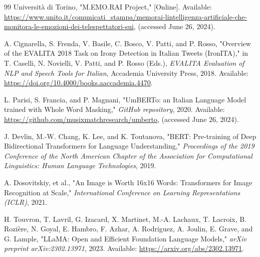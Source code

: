 \documentclass[letterpaper,journal]{IEEEtran}
\begin{document}
\begin{thebibliography}{99}
 Università di Torino, "M.EMO.RAI Project," [Online]. Available: \url{https://www.unito.it/comunicati_stampa/memorai-lintelligenza-artificiale-che-monitora-le-emozioni-dei-telespettatori-sui}, (accessed June 26, 2024).

 A. Cignarella, S. Frenda, V. Basile, C. Bosco, V. Patti, and P. Rosso, "Overview of the EVALITA 2018 Task on Irony Detection in Italian Tweets (IronITA)," in T. Caselli, N. Novielli, V. Patti, and P. Rosso (Eds.), \textit{EVALITA Evaluation of NLP and Speech Tools for Italian}, Accademia University Press, 2018. Available: \url{https://doi.org/10.4000/books.aaccademia.4470}.

 L. Parisi, S. Francia, and P. Magnani, "UmBERTo: an Italian Language Model trained with Whole Word Masking," \textit{GitHub repository}, 2020. Available: \url{https://github.com/musixmatchresearch/umberto}, (accessed June 26, 2024).

 J. Devlin, M.-W. Chang, K. Lee, and K. Toutanova, "BERT: Pre-training of Deep Bidirectional Transformers for Language Understanding," \textit{Proceedings of the 2019 Conference of the North American Chapter of the Association for Computational Linguistics: Human Language Technologies}, 2019.

 A. Dosovitskiy, et al., "An Image is Worth 16x16 Words: Transformers for Image Recognition at Scale," \textit{International Conference on Learning Representations (ICLR)}, 2021.

 H. Touvron, T. Lavril, G. Izacard, X. Martinet, M.-A. Lachaux, T. Lacroix, B. Rozière, N. Goyal, E. Hambro, F. Azhar, A. Rodriguez, A. Joulin, E. Grave, and G. Lample, "LLaMA: Open and Efficient Foundation Language Models," \textit{arXiv preprint arXiv:2302.13971}, 2023. Available: \url{https://arxiv.org/abs/2302.13971}.
\end{thebibliography}
\end{document}
